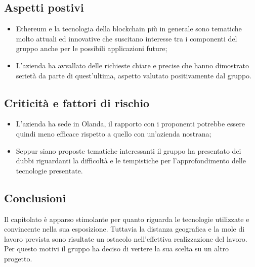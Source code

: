     \subsection{Aspetti postivi}
    \begin{itemize}
        \item Ethereum e la tecnologia della blockchain più in generale sono tematiche molto attuali ed innovative che suscitano interesse tra i componenti del gruppo
        anche per le possibili applicazioni future;
        \item L'azienda ha avvallato delle richieste chiare e precise che hanno dimostrato serietà da parte di quest'ultima, aspetto valutato positivamente dal gruppo.
    \end{itemize}
    \subsection{Criticità e fattori di rischio}
    \begin{itemize}
        \item L'azienda ha sede in Olanda, il rapporto con i proponenti potrebbe essere quindi meno efficace rispetto a quello con un'azienda nostrana;
        \item Seppur siano proposte tematiche interessanti il gruppo ha presentato dei dubbi riguardanti la difficoltà e le tempistiche per l'approfondimento
        delle tecnologie presentate.
    \end{itemize}
    \subsection{Conclusioni}
    Il capitolato è apparso stimolante per quanto riguarda le tecnologie utilizzate e convincente nella sua esposizione. Tuttavia la distanza geografica e la
    mole di lavoro prevista sono risultate un ostacolo nell'effettiva realizzazione del lavoro. Per questo motivi il gruppo ha deciso di vertere la sua scelta
    su un altro progetto.